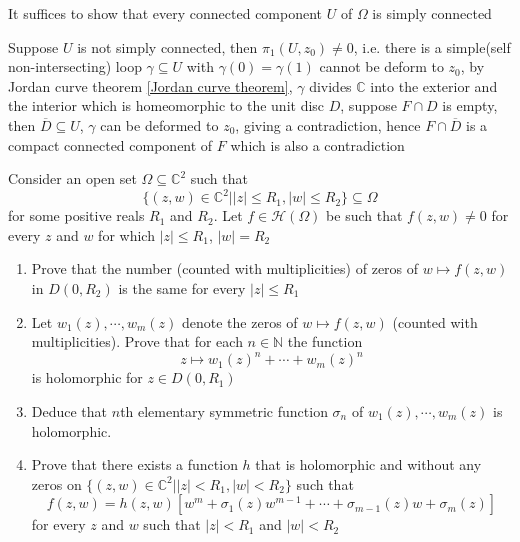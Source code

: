 \documentclass[main]{subfiles}
\begin{document}
\begin{solution}
It suffices to show that every connected component $U$ of $\Omega$ is simply connected \par
Suppose $U$ is not simply connected, then $\pi_1(U,z_0)\neq0$, i.e. there is a simple(self non-intersecting) loop $\gamma\subseteq U$ with $\gamma(0)=\gamma(1)$ cannot be deform to $z_0$, by Jordan curve theorem \ref{Jordan curve theorem}, $\gamma$ divides $\mathbb C$ into the exterior and the interior which is homeomorphic to the unit disc $D$, suppose $F\cap D$ is empty, then $\overline D\subseteq U$, $\gamma$ can be deformed to $z_0$, giving a contradiction, hence $F\cap\overline D$ is a compact connected component of $F$ which is also a contradiction
\end{solution}

\begin{exercise}
Consider an open set $\Omega\subseteq\mathbb C^2$ such that
\[\{(z,w)\in\mathbb C^2||z|\leq R_1,|w|\leq R_2\}\subseteq\Omega\]
for some positive reals $R_1$ and $R_2$. Let $f\in\mathcal H(\Omega)$ be such that $f(z,w)\neq0$ for every $z$ and $w$ for which $|z|\leq R_1$, $|w|=R_2$
\begin{enumerate}[label=\textbf{\arabic*.}, leftmargin=*]
\item Prove that the number (counted with multiplicities) of zeros of $w\mapsto f(z,w)$ in $D(0,R_2)$ is the same for every $|z|\leq R_1$
\item Let $w_1(z),\cdots,w_m(z)$ denote the zeros of $w\mapsto f(z,w)$ (counted with multiplicities). Prove that for each $n\in\mathbb N$ the function
\[z\mapsto w_1(z)^n+\cdots+w_m(z)^n\]
is holomorphic for $z\in D(0,R_1)$
\item Deduce that $n$th elementary symmetric function $\sigma_n$ of $w_1(z),\cdots,w_m(z)$ is holomorphic. \par
\item Prove that there exists a function $h$ that is holomorphic and without any zeros on $\{(z,w)\in\mathbb C^2||z|< R_1,|w|< R_2\}$ such that
\[f(z,w)=h(z,w)[w^m+\sigma_1(z)w^{m-1}+\cdots+\sigma_{m-1}(z)w+\sigma_m(z)]\]
for every $z$ and $w$ such that $|z|<R_1$ and $|w|<R_2$
\end{enumerate}
\end{exercise}
\end{document}
